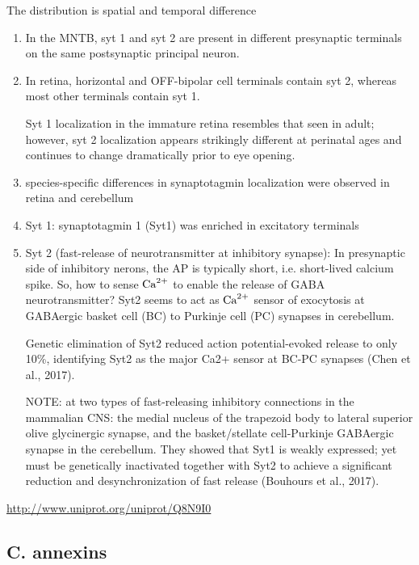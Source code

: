 The distribution is spatial and temporal difference
\begin{enumerate}
  \item In the MNTB, syt 1 and syt 2 are present in different presynaptic
  terminals on the same postsynaptic principal neuron.
  
  \item In retina, horizontal and OFF-bipolar cell terminals contain syt 2,
  whereas most other terminals contain syt 1.
  
Syt 1 localization in the immature retina resembles that seen in adult; however,
syt 2 localization appears strikingly different at perinatal ages and continues
to change dramatically prior to eye opening.  

  \item species-specific differences in synaptotagmin localization were observed
  in retina and cerebellum

  \item Syt 1:  synaptotagmin 1 (Syt1) was enriched in excitatory terminals

  
  \item Syt 2 (fast-release of neurotransmitter at inhibitory synapse):  In
  presynaptic side of inhibitory nerons, the AP is typically short, i.e.
  short-lived calcium spike. So, how to sense ${\text{Ca}^{2+}}$ to enable the release of
  GABA neurotransmitter? Syt2  seems to act as ${\text{Ca}^{2+}}$ sensor of exocytosis at
  GABAergic basket cell (BC) to Purkinje cell (PC) synapses in cerebellum.
  
  Genetic elimination of Syt2 reduced action potential-evoked release to
  only 10\%, identifying Syt2 as the major Ca2+ sensor at BC-PC synapses (Chen
  et al., 2017).

 NOTE: at two types of fast-releasing inhibitory connections in the mammalian
 CNS: the medial nucleus of the trapezoid body to lateral superior olive
 glycinergic synapse, and the basket/stellate cell-Purkinje GABAergic synapse  
 in the cerebellum. They showed that Syt1 is weakly expressed; yet must be
 genetically inactivated together with Syt2 to achieve a significant reduction and
   desynchronization of fast release (Bouhours et al., 2017). 
\end{enumerate}

\url{http://www.uniprot.org/uniprot/Q8N9I0}

\subsection{C. annexins}
\label{sec:annexin}

